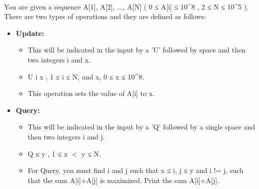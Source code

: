  

You are given a sequence A[1], A[2], ..., A[N] ( 0 ≤ A[i] ≤ 10^8 , 2 ≤ N ≤ 10^5 ). There are two types of operations and they are defined as follows:
\begin{itemize}
	\item \textbf{Update: }
\begin{itemize}
	\item \textbf{​}This will be indicated in the input by a 'U' followed by space and then two integers i and x.
	\item U i x , 1 ≤ i ≤ N, and x, 0 ≤ x ≤ 10^8.
	\item This operation sets the value of A[i] to x.
\end{itemize}
	\item \textbf{Query:}
\begin{itemize}
	\item This will be indicated in the input by a 'Q' followed by a single space and then two integers i and j.
	\item Q x y , 1 ≤ x $<$ y ≤ N.
	\item For Query, you must find i and j such that x ≤ i, j ≤ y and i != j, such that the sum A[i]+A[j] is maximized. Print the sum A[i]+A[j].
\end{itemize}
\end{itemize}

\